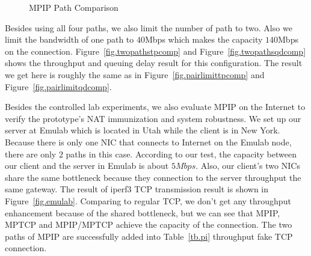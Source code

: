 \begin{figure}[htb]
{
}
\caption{MPIP Path Comparison}
\label{fig.mpip_path}
\end{figure}

Besides using all four paths, we also limit the number of path to two. Also we limit the bandwidth of one path to $40$Mbps which makes the capacity $140$Mbps on the connection. Figure~\ref{fig.twopathstpcomp} and Figure~\ref{fig.twopathsqdcomp} shows the throughput and queuing delay result for this configuration. The result we get here is roughly the same as in Figure~\ref{fig.pairlimittpcomp} and Figure~\ref{fig.pairlimitqdcomp}.


Besides the controlled lab experiments, we also evaluate MPIP on the Internet to verify the prototype's NAT immunization and system robustness. We set up our server at Emulab which is located in Utah while the client is in New York. Because there is only one NIC that connects to Internet on the Emulab node, there are only $2$ paths in this case. According to our test, the capacity between our client and the server in Emulab is about $5Mbps$. Also, our client's two NICs share the same bottleneck because they connection to the server throughput the same gateway. The result of iperf3 TCP transmission result is shown in Figure~\ref{fig.emulab}. Comparing to regular TCP, we don't get any throughput enhancement because of the shared bottleneck, but we can see that MPIP, MPTCP and MPIP/MPTCP achieve the capacity of the connection. The two paths of MPIP are successfully added into Table~\ref{tb.pi} throughput fake TCP connection. 


